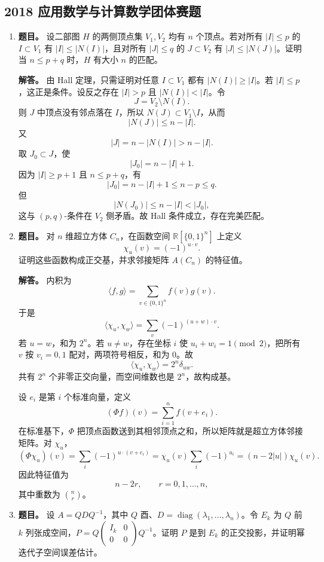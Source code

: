 ﻿\documentclass[UTF8,12pt]{ctexart}
\begin{document}
\subsection{2018 应用数学与计算数学团体赛题}
\begin{enumerate}[label=\textbf{\arabic*.},leftmargin=2.2em]
\item \textbf{题目。} 设二部图 \(H\) 的两侧顶点集 \(V_1,V_2\) 均有 \(n\) 个顶点。若对所有 \(|I|\le p\) 的 \(I\subset V_1\) 有 \(|I|\le |N(I)|\)，且对所有 \(|J|\le q\) 的 \(J\subset V_2\) 有 \(|J|\le |N(J)|\)。证明当 \(n\le p+q\) 时，\(H\) 有大小 \(n\) 的匹配。

\textbf{解答。} 由 Hall 定理，只需证明对任意 \(I\subset V_1\) 都有 \(|N(I)|\ge |I|\)。若 \(|I|\le p\)，这正是条件。设反之存在 \(|I|>p\) 且 \(|N(I)|<|I|\)。令
\[
J=V_2\setminus N(I).
\]
则 \(J\) 中顶点没有邻点落在 \(I\)，所以 \(N(J)\subset V_1\setminus I\)，从而
\[
|N(J)|\le n-|I|.
\]
又
\[
|J|=n-|N(I)|>n-|I|.
\]
取 \(J_0\subset J\)，使
\[
|J_0|=n-|I|+1.
\]
因为 \(|I|\ge p+1\) 且 \(n\le p+q\)，有
\[
|J_0|=n-|I|+1\le n-p\le q.
\]
但
\[
|N(J_0)|\le n-|I|<|J_0|,
\]
这与 \((p,q)\)-条件在 \(V_2\) 侧矛盾。故 Hall 条件成立，存在完美匹配。

\item \textbf{题目。} 对 \(n\) 维超立方体 \(C_n\)，在函数空间 \(\mathbb R[\{0,1\}^n]\) 上定义
\[
\chi_u(v)=(-1)^{u\cdot v}.
\]
证明这些函数构成正交基，并求邻接矩阵 \(A(C_n)\) 的特征值。

\textbf{解答。} 内积为
\[
\langle f,g\rangle=\sum_{v\in\{0,1\}^n}f(v)g(v).
\]
于是
\[
\langle \chi_u,\chi_w\rangle
=\sum_v(-1)^{(u+w)\cdot v}.
\]
若 \(u=w\)，和为 \(2^n\)。若 \(u\ne w\)，存在坐标 \(i\) 使 \(u_i+w_i=1\pmod2\)，把所有 \(v\) 按 \(v_i=0,1\) 配对，两项符号相反，和为 \(0\)。故
\[
\langle \chi_u,\chi_w\rangle=2^n\delta_{uw}.
\]
共有 \(2^n\) 个非零正交向量，而空间维数也是 \(2^n\)，故构成基。

设 \(e_i\) 是第 \(i\) 个标准向量，定义
\[
(\Phi f)(v)=\sum_{i=1}^n f(v+e_i).
\]
在标准基下，\(\Phi\) 把顶点函数送到其相邻顶点之和，所以矩阵就是超立方体邻接矩阵。对 \(\chi_u\)，
\[
(\Phi\chi_u)(v)=\sum_i (-1)^{u\cdot(v+e_i)}
=\chi_u(v)\sum_i(-1)^{u_i}
=(n-2|u|)\chi_u(v).
\]
因此特征值为
\[
n-2r,\qquad r=0,1,\ldots,n,
\]
其中重数为 \(\binom nr\)。

\item \textbf{题目。} 设 \(A=QDQ^{-1}\)，其中 \(Q\) 酉、\(D=\operatorname{diag}(\lambda_1,\ldots,\lambda_n)\)。令 \(E_k\) 为 \(Q\) 前 \(k\) 列张成空间，\(P=Q\begin{pmatrix}I_k&0\\0&0\end{pmatrix}Q^{-1}\)。证明 \(P\) 是到 \(E_k\) 的正交投影，并证明幂迭代子空间误差估计。


\end{enumerate}
\end{document}
